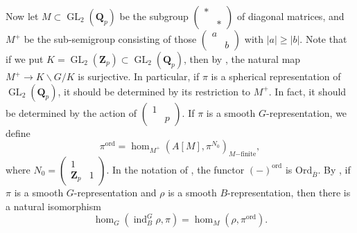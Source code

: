 \documentclass{article}
\DeclareMathOperator{\GL}{GL}
\DeclareMathOperator{\induce}{ind}
\newcommand{\dQ}{\mathbf{Q}}
\newcommand{\dZ}{\mathbf{Z}}
\newcommand{\mat}[4]{\begin{pmatrix} #1 & #2 \\ #3 & #4 \end{pmatrix}}
\newcommand{\ordinary}{\mathrm{ord}}
\begin{document}
Now let $M\subset \GL_2(\dQ_p)$ be the subgroup 
$\mat{\ast}{}{}{\ast}$ of diagonal matrices, and $M^+$ be the sub-semigroup 
consisting of those $\mat{a}{}{}{b}$ with $|a|\geqslant |b|$. Note that if we 
put $K=\GL_2(\dZ_p)\subset \GL_2(\dQ_p)$, then by 
\cite[4.6.2]{bump-1997}, the natural map $M^+\to K\backslash G/K$ is 
surjective. In particular, if $\pi$ is a spherical representation of 
$\GL_2(\dQ_p)$, it should be determined by its restriction to $M^+$. In 
fact, it should be determined by the action of $\mat{1}{}{}{p}$. If 
$\pi$ is a smooth $G$-representation, we define 
\[
  \pi^\ordinary=\hom_{M^+}\left(A[M],\pi^{N_0}\right)_{M\mathrm{-finite}} ,
\]
where $N_0=\mat{1}{}{\dZ_p}{1}$. In the 
notation of \cite{emerton-2010-i}, the functor $(-)^\ordinary$ is 
$\mathrm{Ord}_{\overline B}$. By \cite[4.4.6]{emerton-2010-i}, if 
$\pi$ is a smooth $G$-representation and $\rho$ is a smooth $B$-representation, 
then there is a natural isomorphism 
\[
  \hom_G\left(\induce_B^G\rho,\pi\right) = \hom_M\left(\rho,\pi^\ordinary\right) .
\]





\printbibliography
\end{document}
